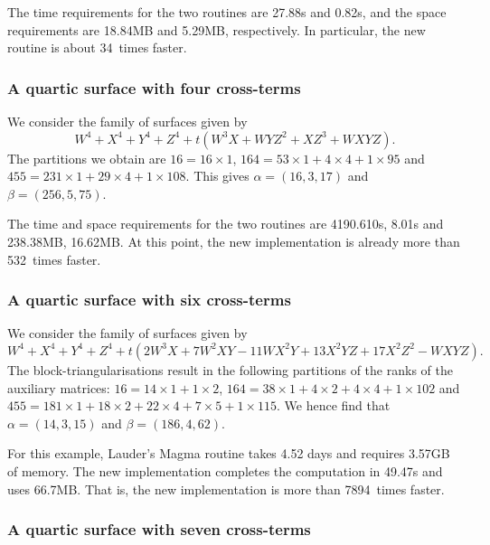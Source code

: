 The time requirements for the two routines are 27.88s and 0.82s, and the 
space requirements are 18.84MB and 5.29MB, respectively.  In particular, 
the new routine is about 34~times faster.

\subsubsection{A quartic surface with four cross-terms}

We consider the family of surfaces given by 
\begin{equation*}
W^4 + X^4 + Y^4 + Z^4 + t (W^3 X + W Y Z^2 + X Z^3 + W X Y Z).
\end{equation*}
The partitions we obtain are $16 = 16 \times 1$, 
$164 = 53 \times 1 + 4 \times 4 + 1 \times 95$ and 
$455 = 231 \times 1 + 29 \times 4 + 1 \times 108$.  This gives 
$\alpha = (16,3,17)$ and $\beta = (256,5,75)$.

The time and space requirements for the two routines are 4190.610s, 8.01s and 
238.38MB, 16.62MB.  At this point, the new implementation is already more 
than 532~times faster.

\subsubsection{A quartic surface with six cross-terms}

We consider the family of surfaces given by
\begin{equation*}
W^4 + X^4 + Y^4 + Z^4 + t (2 W^3 X + 7 W^2 X Y - 11 W X^2 Y + 13 X^2 Y Z + 17 X^2 Z^2 - W X Y Z).
\end{equation*}
The block-triangularisations result in the following partitions of the ranks 
of the auxiliary matrices:  $16 = 14 \times 1 + 1 \times 2$, 
$164 = 38 \times 1 + 4 \times 2 + 4 \times 4 + 1 \times 102$ and 
$455 = 181 \times 1 + 18 \times 2 + 22 \times 4 + 7 \times 5 + 1 \times 115$. 
We hence find that $\alpha = (14,3,15)$ and $\beta = (186,4,62)$.

For this example, Lauder's {\sc Magma} routine takes 4.52 days and requires 
3.57GB of memory.  The new implementation completes the computation in 
49.47s and uses 66.7MB.  That is, the new implementation is more than 
7894~times faster.

\subsubsection{A quartic surface with seven cross-terms}

